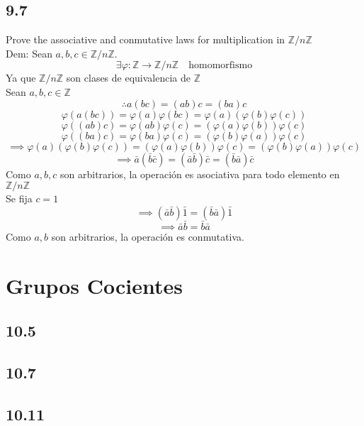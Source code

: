 \documentclass[11pt]{article}
\begin{document}
\subsection*{9.7}
Prove the associative and conmutative laws for multiplication in $\mathbb{Z}/n\mathbb{Z}$\\
Dem: Sean $a,b,c\in\mathbb{Z}/n\mathbb{Z}$.
\[
\exists \varphi:\mathbb{Z}\rightarrow\mathbb{Z}/n\mathbb{Z}\quad\textrm{homomorfismo}
\]
Ya que $\mathbb{Z}/n\mathbb{Z}$ son clases de equivalencia de $\mathbb{Z}$\\
Sean $a,b,c\in\mathbb{Z}$
\[
\therefore a(bc)=(ab)c=(ba)c
\]
\[
\varphi(a(bc))=\varphi(a)\varphi(bc)=\varphi(a)(\varphi(b)\varphi(c))
\]
\[
\varphi((ab)c)=\varphi(ab)\varphi(c)=(\varphi(a)\varphi(b))\varphi(c)
\]
\[
\varphi((ba)c)=\varphi(ba)\varphi(c)=(\varphi(b)\varphi(a))\varphi(c)
\]
\[
\implies \varphi(a)(\varphi(b)\varphi(c))=(\varphi(a)\varphi(b))\varphi(c)=(\varphi(b)\varphi(a))\varphi(c)
\]
\[
\implies \bar{a}(\bar{b}\bar{c})=(\bar{a}\bar{b})\bar{c}=(\bar{b}\bar{a})\bar{c}
\]
Como $a,b,c$ son arbitrarios, la operación es asociativa para todo elemento en $\mathbb{Z}/n\mathbb{Z}$\\
Se fija $c=1$
\[
\implies (\bar{a}\bar{b})\bar{1}=(\bar{b}\bar{a})\bar{1}
\]
\[
\implies \bar{a}\bar{b}=\bar{b}\bar{a}
\]
Como $a,b$ son arbitrarios, la operación es conmutativa.
\section{Grupos Cocientes}
\subsection*{10.5}
\subsection*{10.7}
\subsection*{10.11}
\end{document}
